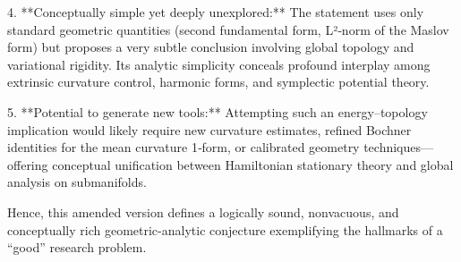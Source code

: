 4. **Conceptually simple yet deeply unexplored:**  
   The statement uses only standard geometric quantities (second fundamental form, L²‑norm of the Maslov form) but proposes a very subtle conclusion involving global topology and variational rigidity. Its analytic simplicity conceals profound interplay among extrinsic curvature control, harmonic forms, and symplectic potential theory.

5. **Potential to generate new tools:**  
   Attempting such an energy–topology implication would likely require new curvature estimates, refined Bochner identities for the mean curvature 1‑form, or calibrated geometry techniques—offering conceptual unification between Hamiltonian stationary theory and global analysis on submanifolds.

Hence, this amended version defines a logically sound, nonvacuous, and conceptually rich geometric-analytic conjecture exemplifying the hallmarks of a “good” research problem.